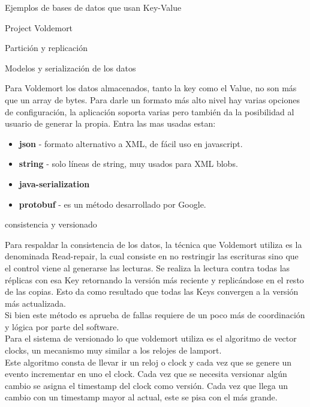 \begin{section}{Ejemplos de bases de datos que usan Key-Value}
\begin{subsection}{Project Voldemort}
\begin{subsubsection}{Partición y replicación}
\end{subsubsection}

\begin{subsubsection}{Modelos y serialización de los datos}

Para Voldemort los datos almacenados, tanto la key como el Value, no son más que un array de bytes. Para darle un formato más alto nivel hay varias opciones de configuración, la aplicación soporta varias pero también da la posibilidad al usuario de generar la propia. Entra las mas usadas estan:\\

\begin{itemize}

\item \textbf{json} - formato alternativo a XML, de fácil uso en javascript.
\item \textbf{string} - solo líneas de string, muy usados para XML blobs.
\item \textbf{java-serialization}
\item \textbf{protobuf} - es un método desarrollado por Google.

\end{itemize}

\end{subsubsection}

\begin{subsubsection}{consistencia y versionado}

Para respaldar la consistencia de los datos, la técnica que Voldemort utiliza es la denominada Read-repair, la cual consiste en no restringir las escrituras sino que el control viene al generarse las lecturas. Se realiza la lectura contra todas las réplicas con esa Key retornando la versión más reciente y replicándose en el resto de las copias. Esto da como resultado que todas las Keys convergen a la versión más actualizada.\\

Si bien este método es aprueba de fallas requiere de un poco más de coordinación y lógica por parte del software.\\

Para el sistema de versionado lo que voldemort utiliza es el algoritmo de vector clocks, un mecanismo muy similar a los relojes de lamport. \\

Este algoritmo consta de llevar ir un reloj o clock y cada vez que se genere un evento incrementar en uno el clock. Cada vez que se necesita versionar algún cambio se asigna el timestamp del clock como versión. Cada vez que llega un cambio con un timestamp mayor al actual, este se pisa con el más grande. \\


\end{subsubsection}
\end{subsection}
\end{section}
